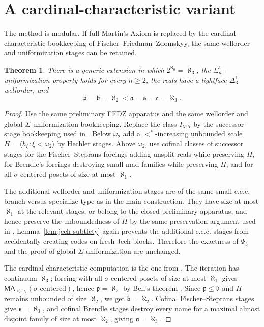 \documentclass[11pt]{article}
\theoremstyle{plain}
\newtheorem{theorem}{Theorem}[section]
\theoremstyle{definition}
\theoremstyle{remark}
\newcommand{\MA}{\mathsf{MA}}
\newcommand{\PsiThree}{\Psi_{3}}
\begin{document}
\section{A cardinal-characteristic variant}\label{sec:cardinal-variant}

The method is modular.  If full Martin's Axiom is replaced by the
cardinal-characteristic bookkeeping of Fischer--Friedman--Zdomskyy, the same
wellorder and uniformization stages can be retained.

\begin{theorem}\label{thm:cardinal-variant}
There is a generic extension in which $2^{\aleph_0}=\aleph_3$, the
$\Sigma^1_n$-uniformization property holds for every $n\geq2$, the reals have a
lightface $\Delta^1_3$ wellorder, and
\[
\mathfrak p=\mathfrak b=\aleph_2<\mathfrak a=\mathfrak s=\mathfrak c=\aleph_3.
\]
\end{theorem}

\begin{proof}
Use the same preliminary FFDZ apparatus and the same wellorder and global
$\Sigma$-uniformization bookkeeping.  Replace the class $I_{\mathrm{MA}}$ by the
successor-stage bookkeeping used in \cite[Section 3]{FISCHER2013763}.  Below
$\omega_2$ add a $<^*$-increasing unbounded scale
$H=\langle h_\xi:\xi<\omega_2\rangle$ by Hechler stages.  Above $\omega_2$, use
cofinal classes of successor stages for the Fischer--Steprans forcings adding
unsplit reals while preserving $H$, for Brendle's forcings destroying small mad
families while preserving $H$, and for all $\sigma$-centered posets of size at
most $\aleph_1$.

The additional wellorder and uniformization stages are of the same small c.c.c.
branch-versus-specialize type as in the main construction.  They have size at
most $\aleph_1$ at the relevant stages, or belong to the closed preliminary
apparatus, and hence preserve the unboundedness of $H$ by the same preservation
argument used in \cite{FISCHER2013763}.  Lemma~\ref{lem:jech-subtlety} again
prevents the additional c.c.c. stages from accidentally creating codes on fresh
Jech blocks.  Therefore the exactness of $\PsiThree$ and the proof of global
$\Sigma$-uniformization are unchanged.

The cardinal-characteristic computation is the one from
\cite[Corollary 3.1]{FISCHER2013763}.  The iteration has continuum $\aleph_3$;
forcing with all $\sigma$-centered posets of size at most $\aleph_1$ gives
$\MA_{<\omega_2}(\sigma\text{-centered})$, hence $\mathfrak p=\aleph_2$ by Bell's
theorem \cite{Bell}.  Since $\mathfrak p\leq\mathfrak b$ and $H$ remains
unbounded of size $\aleph_2$, we get $\mathfrak b=\aleph_2$.  Cofinal
Fischer--Steprans stages give $\mathfrak s=\aleph_3$, and cofinal Brendle stages
destroy every name for a maximal almost disjoint family of size at most
$\aleph_2$, giving $\mathfrak a=\aleph_3$.
\end{proof}
\end{document}
